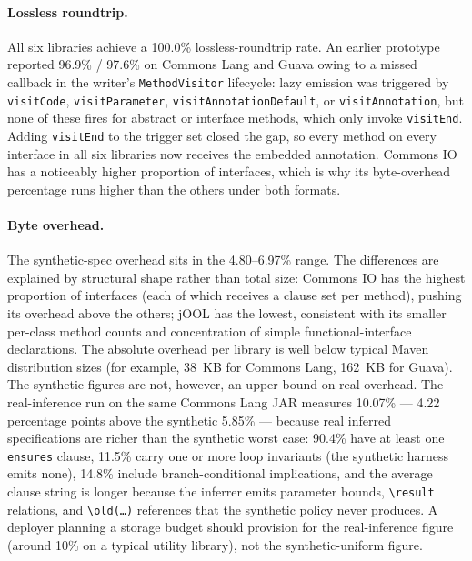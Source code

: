 \paragraph{Lossless roundtrip.}
All six libraries achieve a 100.0\% lossless-roundtrip rate. An earlier prototype
reported 96.9\% / 97.6\% on Commons Lang and Guava owing to a missed callback in
the writer's \texttt{MethodVisitor} lifecycle: lazy emission was triggered by
\texttt{visitCode}, \texttt{visitParameter}, \texttt{visitAnnotationDefault}, or
\texttt{visitAnnotation}, but none of these fires for abstract or interface
methods, which only invoke \texttt{visitEnd}. Adding \texttt{visitEnd} to the
trigger set closed the gap, so every method on every interface in all six
libraries now receives the embedded annotation. Commons IO has a noticeably
higher proportion of interfaces, which is why its byte-overhead percentage runs
higher than the others under both formats.

\paragraph{Byte overhead.}
The synthetic-spec overhead sits in the 4.80--6.97\% range. The differences are
explained by structural shape rather than total size: Commons IO has the highest
proportion of interfaces (each of which receives a clause set per method),
pushing its overhead above the others; jOOL has the lowest, consistent with its
smaller per-class method counts and concentration of simple functional-interface
declarations. The absolute overhead per library is well below typical Maven
distribution sizes (for example, 38~KB for Commons Lang, 162~KB for Guava). The
synthetic figures are not, however, an upper bound on real overhead. The
real-inference run on the same Commons Lang JAR measures 10.07\% --- 4.22
percentage points above the synthetic 5.85\% --- because real inferred
specifications are richer than the synthetic worst case: 90.4\% have at least one
\texttt{ensures} clause, 11.5\% carry one or more loop invariants (the synthetic
harness emits none), 14.8\% include branch-conditional implications, and the
average clause string is longer because the inferrer emits parameter bounds,
\texttt{\textbackslash result} relations, and \texttt{\textbackslash old(\dots)}
references that the synthetic policy never produces. A deployer planning a
storage budget should provision for the real-inference figure (around 10\% on a
typical utility library), not the synthetic-uniform figure.

